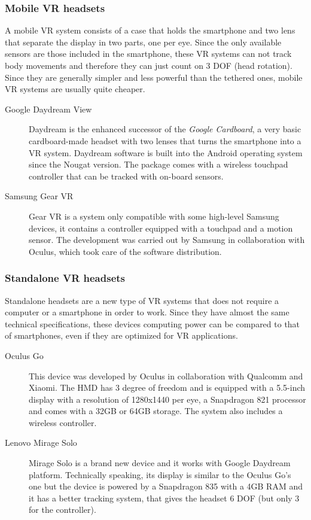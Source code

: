 \documentclass[binding=0.6cm,LaM]{sapthesis}
\begin{document}
\subsubsection{Mobile VR headsets}

A mobile VR system consists of a case that holds the smartphone and two lens that separate the display in two parts, one per eye. Since the only available sensors are those included in the smartphone, these VR systems can not track body movements and therefore they can just count on 3 DOF (head rotation). Since they are generally simpler and less powerful than the tethered ones, mobile VR systems are usually quite cheaper.

\begin{description}

\item[Google Daydream View]
Daydream is the enhanced successor of the \textit{Google Cardboard}, a very basic cardboard-made headset with two lenses that turns the smartphone into a VR system. Daydream software is built into the Android operating system since the Nougat version. The package comes with a wireless touchpad controller that can be tracked with on-board sensors.

\item[Samsung Gear VR]
Gear VR is a system only compatible with some high-level Samsung devices, it contains a controller equipped with a touchpad and a motion sensor. The development was carried out by Samsung in collaboration with Oculus, which took care of the software distribution. 

\end{description}

\subsubsection{Standalone VR headsets}
Standalone headsets are a new type of VR systems that does not require a computer or a smartphone in order to work. Since they have almost the same technical specifications, these devices computing power can be compared to that of smartphones, even if they are optimized for VR applications.

\begin{description}

\item[Oculus Go]
This device was developed by Oculus in collaboration with Qualcomm and Xiaomi. The HMD has 3 degree of freedom and is equipped with a 5.5-inch display with a resolution of 1280x1440 per eye, a Snapdragon 821 processor and comes with a 32GB or 64GB storage. The system also includes a wireless controller. 

\item[Lenovo Mirage Solo]
Mirage Solo is a brand new device and it works with Google Daydream platform. Technically speaking, its display is similar to the Oculus Go's one but the device is powered by a Snapdragon 835 with a 4GB RAM and it has a better tracking system, that gives the headset 6 DOF (but only 3 for the controller).

\end{description}
\end{document}
